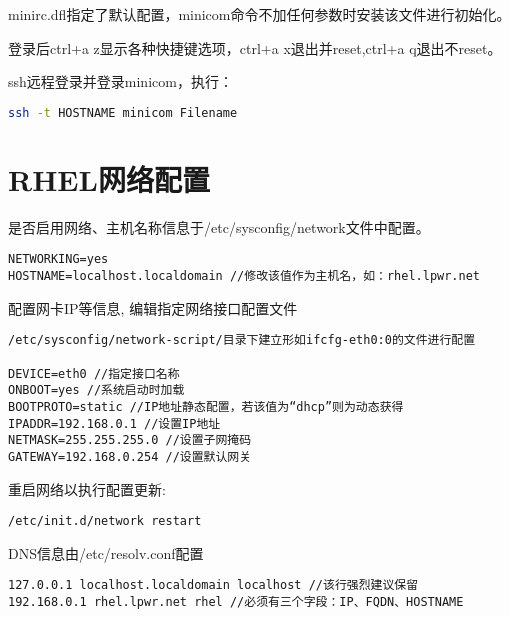 minirc.dfl指定了默认配置，minicom命令不加任何参数时安装该文件进行初始化。

登录后ctrl+a z显示各种快捷键选项，ctrl+a x退出并reset,ctrl+a q退出不reset。

ssh远程登录并登录minicom，执行：
\begin{lstlisting}[language=bash]
ssh -t HOSTNAME minicom Filename
\end{lstlisting}

\section{RHEL网络配置}


是否启用网络、主机名称信息于/etc/sysconfig/network文件中配置。
\begin{verbatim}
NETWORKING=yes
HOSTNAME=localhost.localdomain //修改该值作为主机名，如：rhel.lpwr.net
\end{verbatim}

配置网卡IP等信息, 编辑指定网络接口配置文件
\begin{verbatim}
/etc/sysconfig/network-script/目录下建立形如ifcfg-eth0:0的文件进行配置

DEVICE=eth0 //指定接口名称
ONBOOT=yes //系统启动时加载
BOOTPROTO=static //IP地址静态配置，若该值为“dhcp”则为动态获得
IPADDR=192.168.0.1 //设置IP地址
NETMASK=255.255.255.0 //设置子网掩码
GATEWAY=192.168.0.254 //设置默认网关
\end{verbatim}

重启网络以执行配置更新:

\begin{verbatim}
/etc/init.d/network restart
\end{verbatim}

DNS信息由/etc/resolv.conf配置
\begin{verbatim}
127.0.0.1 localhost.localdomain localhost //该行强烈建议保留
192.168.0.1 rhel.lpwr.net rhel //必须有三个字段：IP、FQDN、HOSTNAME
\end{verbatim}



